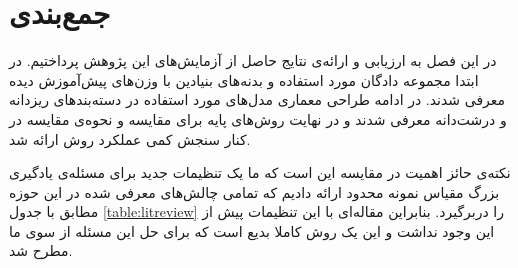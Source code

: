 \section{جمع‌بندی}

در این فصل به ارزیابی و ارائه‌ی نتایج حاصل از آزمایش‌های این پژوهش پرداختیم. در ابتدا مجموعه دادگان مورد استفاده و بدنه‌های بنیادین با وزن‌های پیش‌آموزش دیده معرفی شدند. در ادامه طراحی معماری مدل‌های مورد استفاده در دسته‌بندهای ریزدانه و درشت‌دانه معرفی شدند و در نهایت روش‌های پایه برای مقایسه و نحوه‌ی مقایسه در کنار سنجش کمی عملکرد روش ارائه شد. 

نکته‌ی حائز اهمیت در مقایسه این است که ما یک تنظیمات جدید برای مسئله‌ی یادگیری بزرگ مقیاس نمونه محدود ارائه دادیم که تمامی چالش‌های معرفی شده در این حوزه مطابق با جدول 
\ref{table:litreview}
را دربرگیرد. بنابراین مقاله‌ای با این تنظیمات پیش از این وجود نداشت و این یک روش کاملا بدیع است که برای حل این مسئله از سوی ما مطرح شد. 


